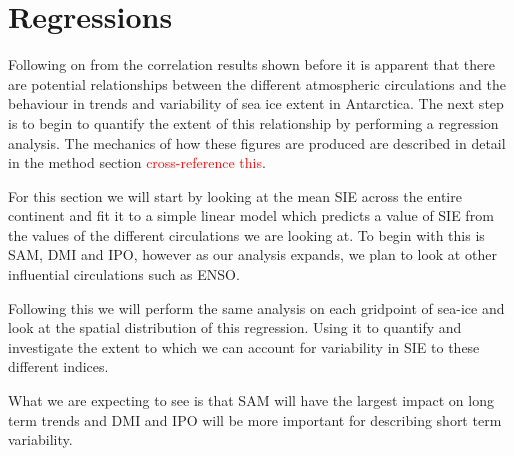 \chapter{Regressions}

Following on from the correlation results shown before it is apparent that there are potential relationships between the different atmospheric circulations and the behaviour in trends and variability of sea ice extent in Antarctica. The next step is to begin to quantify the extent of this relationship by performing a regression analysis. The mechanics of how these figures are produced are described in detail in the method section \textcolor{red}{cross-reference this}. 

For this section we will start by looking at the mean SIE across the entire continent and fit it to a simple linear model which predicts a value of SIE from the values of the different circulations we are looking at. To begin with this is SAM, DMI and IPO, however as our analysis expands, we plan to look at other influential circulations such as ENSO.

Following this we will perform the same analysis on each gridpoint of sea-ice and look at the spatial distribution of this regression. Using it to quantify and investigate the extent to which we can account for variability in SIE to these different indices.

What we are expecting to see is that SAM will have the largest impact on long term trends and DMI and IPO will be more important for describing short term variability.

\newpage

\newpage
